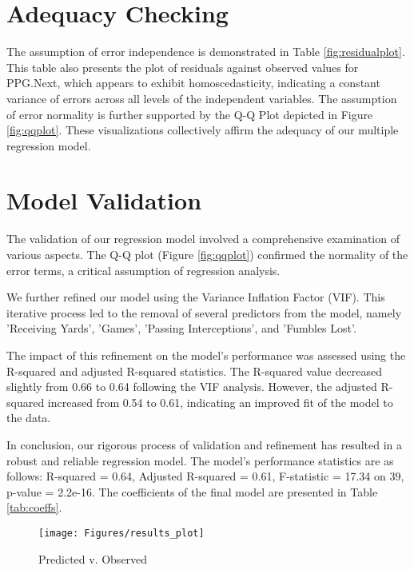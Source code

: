 \section{Adequacy Checking}

The assumption of error independence is demonstrated in Table \ref{fig:residualplot}. This table also presents the plot of residuals against observed values for PPG.Next, which appears to exhibit homoscedasticity, indicating a constant variance of errors across all levels of the independent variables. The assumption of error normality is further supported by the Q-Q Plot depicted in Figure \ref{fig:qqplot}. These visualizations collectively affirm the adequacy of our multiple regression model.


\section{Model Validation}

The validation of our regression model involved a comprehensive examination of various aspects. The Q-Q plot (Figure \ref{fig:qqplot}) confirmed the normality of the error terms, a critical assumption of regression analysis.

We further refined our model using the Variance Inflation Factor (VIF). This iterative process led to the removal of several predictors from the model, namely 'Receiving Yards', 'Games', 'Passing Interceptions', and 'Fumbles Lost'.

The impact of this refinement on the model's performance was assessed using the R-squared and adjusted R-squared statistics. The R-squared value decreased slightly from 0.66 to 0.64 following the VIF analysis. However, the adjusted R-squared increased from 0.54 to 0.61, indicating an improved fit of the model to the data.

In conclusion, our rigorous process of validation and refinement has resulted in a robust and reliable regression model. The model's performance statistics are as follows: R-squared = 0.64, Adjusted R-squared = 0.61, F-statistic = 17.34 on 39, p-value = 2.2e-16. The coefficients of the final model are presented in Table \ref{tab:coeffs}.

\begin{figure}[h]
	\centering
	\texttt{[image: Figures/results\_plot]}
	\caption{Predicted v. Observed}
	\label{fig:resultsplot}
\end{figure}






